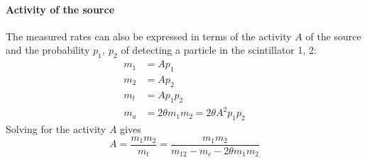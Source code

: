 \paragraph{Activity of the source}
The measured rates can also be expressed in terms of the activity \(A\) of the source and the probability \(p_1,\ p_2\) of detecting a particle in the scintillator 1, 2:
\begin{equation}
    \begin{aligned}
        m_1 &= A p_1 \\
        m_2 &= A p_2 \\
        m_t &= A p_1 p_2 \\
        m_a &= 2\theta m_1 m_2 = 2\theta A^2 p_1 p_2
    \end{aligned}
\end{equation}
Solving for the activity \(A\) gives
\begin{equation}
    A = \frac{m_1 m_2}{m_t} = \frac{m_1 m_2}{m_{12} - m_c - 2\theta m_1 m_2}
\end{equation}
